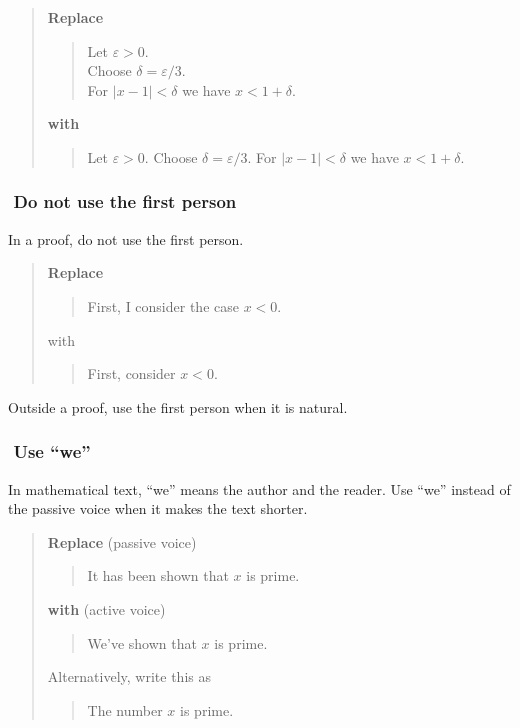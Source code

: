 \documentclass[12pt]{article}
\newcounter{ex}\setcounter{ex}{0}
\newcommand{\ex}{%
\hspace{-0.2in} \setcounter{ex}{\value{ex}+1}
\theex \,\,}
\newcounter{id}\setcounter{id}{0}
\newcounter{se}\setcounter{se}{0}
\begin{document}
\begin{quote}
\textbf{Replace}
\begin{quote}
\begin{centering}
Let \(\varepsilon > 0\). \\
Choose \(\delta = \varepsilon / 3 \). \\
For \(|x - 1| < \delta \) we have \(x < 1 + \delta\). \\
\end{centering}
\end{quote}
\textbf{with}
\begin{quote}
Let \(\varepsilon > 0\).  Choose \(\delta = \varepsilon / 3 \).
For \(|x - 1| < \delta \) we have \mbox{\(x<1 + \delta\)}.
\end{quote}
\end{quote}






\subsubsection*{\ex  Do not use the first person} 

In a proof, do not  use the first person.  

\begin{quote}
\textbf{Replace}
\begin{quote}
First, I consider the case \(x < 0\).
\end{quote}
with
\begin{quote}
 First, consider \(x < 0\).
\end{quote}
\end{quote}

Outside a proof, use the first person when it is natural.

\subsubsection*{\ex  Use ``we''}

In mathematical text, ``we'' means the author and the reader.
Use ``we'' instead of the passive voice when it makes the 
text shorter.

\begin{quote}
\textbf{Replace} (passive voice)
\begin{quote}
  It has been shown that \(x\) is prime.
\end{quote}
\textbf{with} (active voice)
\begin{quote}
  We've shown that \(x\) is prime.
\end{quote}
Alternatively, write this as
\begin{quote}
  The number \(x\) is prime.
\end{quote}
\end{quote}
\end{document}
